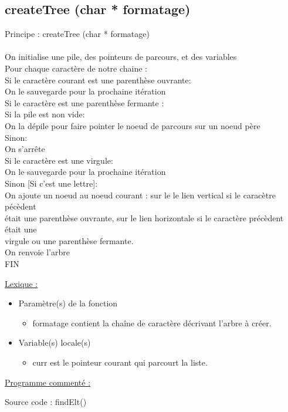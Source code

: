 \documentclass[a4paper]{article}
\newcommand\tab[1][1cm]{\hspace*{#1}}
\begin{document}
\subsection{createTree (char * formatage)}
\begin{algorithm}
Principe : createTree (char * formatage)
\\
\\
\tab On initialise une pile, des pointeurs de parcours, et des variables
\\
\tab Pour chaque caractère de notre chaine :
\\
\tab \tab Si le caractère courant est une parenthèse ouvrante:
\\
\tab \tab \tab On le sauvegarde pour la prochaine itération
\\
\tab \tab Si le caractère est une parenthèse fermante :
\\
\tab \tab \tab Si la pile est non vide:
\\
\tab \tab \tab \tab On la dépile pour faire pointer le noeud de parcours sur un noeud père
\\
\tab \tab \tab Sinon:
\\
\tab \tab \tab \tab On s'arrête
\\
\tab \tab Si le caractère est une virgule:
\\
\tab \tab \tab On le sauvegarde pour la prochaine itération
\\
\tab \tab Sinon [Si c'est une lettre]:
\\
\tab \tab \tab On ajoute un noeud au noeud courant : sur le le lien vertical si le caracètre pécèdent 
\\
\tab \tab \tab était une parenthèse ouvrante, sur le lien horizontale si le caractère précèdent était une
\\
\tab \tab \tab virgule ou une parenthèse fermante.
\\
\tab On renvoie l'arbre
\\
FIN
\end{algorithm}
\underline{Lexique :}
\begin{itemize}
\item Paramètre(s) de la fonction  
\begin{itemize}
\item formatage contient la chaîne de caractère décrivant l'arbre à créer.
\end{itemize}
\item Variable(s) locale(s)
\begin{itemize}
\item curr est le pointeur courant qui parcourt la liste.
\end{itemize}
\end{itemize}
\underline{Programme commenté :}
\begin{center}

Source code : findElt()
\end{center}
\end{document}
